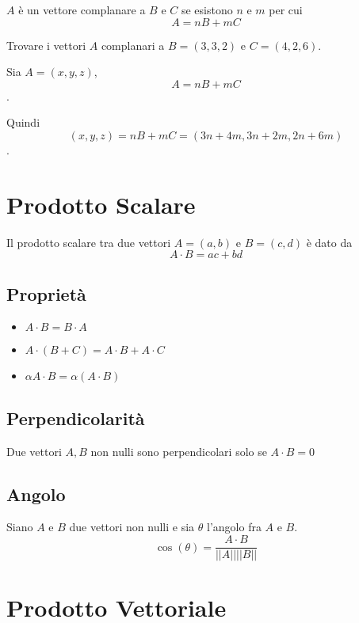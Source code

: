 $A$ è un vettore complanare a $B$ e $C$ se esistono $n$ e $m$ per cui $$A=nB+mC$$

\begin{example}
Trovare i vettori $A$ complanari a $B=(3,3,2)$ e $C=(4,2,6)$.

Sia $A=(x,y,z)$, $$A=nB+mC$$.

Quindi $$(x,y,z)=nB+mC=(3n+4m,3n+2m,2n+6m)$$.
\end{example}

\section{Prodotto Scalare}

\begin{definition}
Il prodotto scalare tra due vettori $A=(a,b)$ e $B=(c,d)$ è dato da $$A \cdot B = ac+bd$$
\end{definition}

\subsection{Proprietà}

\begin{itemize}
\item $A \cdot B = B \cdot A$
\item $A \cdot (B+C) = A \cdot B + A \cdot C$
\item $\alpha A \cdot B = \alpha(A \cdot B)$
\end{itemize}

\subsection{Perpendicolarità}

\begin{theorem}
Due vettori $A,B$ non nulli sono perpendicolari solo se $A \cdot B=0$
\end{theorem}

\subsection{Angolo}

\begin{theorem}
Siano $A$ e $B$ due vettori non nulli e sia $\theta$ l'angolo fra $A$ e $B$. $$\cos(\theta) = \frac{A \cdot B}{||A|| ||B||}$$
\end{theorem}


\section{Prodotto Vettoriale}

